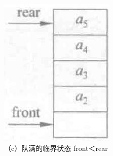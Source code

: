 \documentclass[10pt]{article}
\begin{document}
\includegraphics[max width=\textwidth, center]{2025_06_06_704745ea57b15b2333e5g-094(3)}\\
（c）队满的临界状态 front＜rear\\
\end{document}
